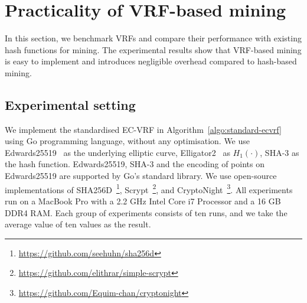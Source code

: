 \section{Practicality of VRF-based mining}
\label{sec:practicality}

In this section, we benchmark VRFs and compare their performance with existing hash functions for mining.
The experimental results show that VRF-based mining is easy to implement and introduces negligible overhead compared to hash-based mining.

\subsection{Experimental setting}

We implement the standardised EC-VRF in Algorithm~\ref{algo:standard-ecvrf} using Go programming language, without any optimisation.
We use Edwards25519~\cite{bernstein2012high} as the underlying elliptic curve, Elligator2~\cite{bernstein2013elligator} as $H_1(\cdot)$, SHA-3 as the hash function.
Edwards25519, SHA-3 and the encoding of points on Edwards25519 are supported by Go's standard library.
We use open-source implementations of SHA256D~\footnote{\url{https://github.com/seehuhn/sha256d}}, Scrypt~\footnote{\url{https://github.com/elithrar/simple-scrypt}}, and CryptoNight~\footnote{\url{https://github.com/Equim-chan/cryptonight}}.
All experiments run on a MacBook Pro with a 2.2 GHz Intel Core i7 Processor and a 16 GB DDR4 RAM.
Each group of experiments consists of ten runs, and we take the average value of ten values as the result.

